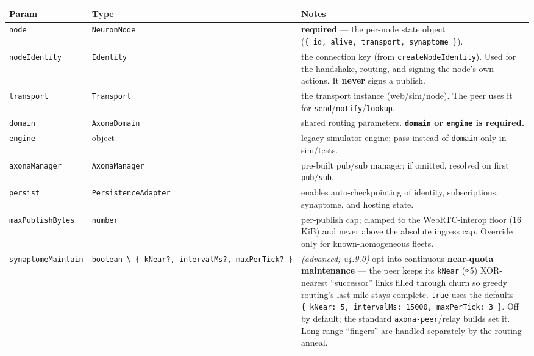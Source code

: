 \documentclass[
  nobib]{tufte-handout}
\newcounter{none} %
\begin{document}
{\def\LTcaptype{none} %
\begin{longtable}[]{@{}
  >{\raggedright\arraybackslash}p{}
  >{\raggedright\arraybackslash}p{}
  >{\raggedright\arraybackslash}p{}@{}}
\toprule\noalign{}
\begin{minipage}[b]{\linewidth}\raggedright
Param
\end{minipage} & \begin{minipage}[b]{\linewidth}\raggedright
Type
\end{minipage} & \begin{minipage}[b]{\linewidth}\raggedright
Notes
\end{minipage} \\
\midrule\noalign{}
\endhead
\bottomrule\noalign{}
\endlastfoot
\texttt{node} & \texttt{NeuronNode} & \textbf{required} --- the per-node
state object (\texttt{\{\ id,\ alive,\ transport,\ synaptome\ \}}). \\
\texttt{nodeIdentity} & \texttt{Identity} & the connection key (from
\texttt{createNodeIdentity}). Used for the handshake, routing, and
signing the node's own actions. It \textbf{never} signs a publish. \\
\texttt{transport} & \texttt{Transport} & the transport instance
(web/sim/node). The peer uses it for
\texttt{send}/\texttt{notify}/\texttt{lookup}. \\
\texttt{domain} & \texttt{AxonaDomain} & shared routing parameters.
\textbf{\texttt{domain} or \texttt{engine} is required.} \\
\texttt{engine} & object & legacy simulator engine; pass instead of
\texttt{domain} only in sim/tests. \\
\texttt{axonaManager} & \texttt{AxonaManager} & pre-built pub/sub
manager; if omitted, resolved on first \texttt{pub}/\texttt{sub}. \\
\texttt{persist} & \texttt{PersistenceAdapter} & enables
auto-checkpointing of identity, subscriptions, synaptome, and hosting
state. \\
\texttt{maxPublishBytes} & \texttt{number} & per-publish cap; clamped to
the WebRTC-interop floor (16 KiB) and never above the absolute ingress
cap. Override only for known-homogeneous fleets. \\
\texttt{synaptomeMaintain} &
\texttt{boolean\ \textbackslash{}\textbar{}\ \{\ kNear?,\ intervalMs?,\ maxPerTick?\ \}}
& \emph{(advanced; v4.9.0)} opt into continuous \textbf{near-quota
maintenance} --- the peer keeps its \texttt{kNear} (≈5) XOR-nearest
``successor'' links filled through churn so greedy routing's last mile
stays complete. \texttt{true} uses the defaults
\texttt{\{\ kNear:\ 5,\ intervalMs:\ 15000,\ maxPerTick:\ 3\ \}}. Off by
default; the standard \texttt{axona-peer}/relay builds set it.
Long-range ``fingers'' are handled separately by the routing anneal. \\
\end{longtable}
}
\end{document}
